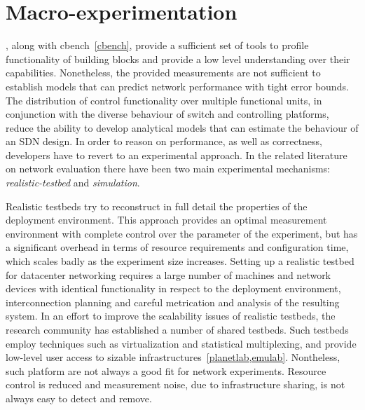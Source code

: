 

\section{\of Macro-experimentation} \label{sec:sdnsim-intro}


\oflops, along with cbench~\ref{cbench}, provide a sufficient set of tools to
profile functionality of \of building blocks and provide a low level
understanding over their capabilities. Nonetheless, the provided measurements
are not sufficient to establish models that can predict network performance with
tight error bounds. The distribution of control functionality over multiple
functional units, in conjunction with the diverse behaviour of \of switch and
controlling platforms, reduce the ability to develop analytical models that can
estimate the behaviour of an SDN design. In order to reason on performance, as
well as correctness, developers have to revert to an experimental approach.
In the related literature on network evaluation there have been two main
experimental mechanisms: \emph{realistic-testbed} and \emph{simulation}.

Realistic testbeds try to reconstruct in full detail the properties of the
deployment environment. This approach provides an optimal measurement
environment with complete control over the parameter of the experiment, but has
a significant overhead in terms of resource requirements and configuration time,
which scales badly as the experiment size increases.  Setting up a realistic
testbed for datacenter networking requires a large number of machines and
network devices with identical functionality in respect to the deployment
environment, interconnection planning and careful metrication and analysis of
the resulting system. In an effort to improve the scalability issues of
realistic testbeds, the research community has established a number of shared
testbeds. Such testbeds employ techniques such as virtualization and statistical
multiplexing, and provide low-level user access to sizable
infrastructures~\ref{planetlab,emulab}.  Nontheless, such platform are not
always a good fit for network experiments. Resource control
is reduced and measurement noise, due to infrastructure sharing, is not always
easy to detect and remove. 

